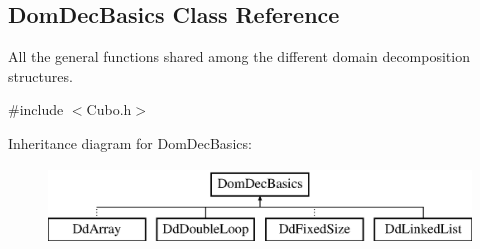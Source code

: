 \hypertarget{classDomDecBasics}{}\subsection{Dom\+Dec\+Basics Class Reference}
\label{classDomDecBasics}


All the general functions shared among the different domain decomposition structures.  




{\ttfamily \#include $<$Cubo.\+h$>$}

Inheritance diagram for Dom\+Dec\+Basics\+:\begin{figure}[H]
\begin{center}
\leavevmode
\includegraphics[height=2.000000cm]{classDomDecBasics}
\end{center}
\end{figure}
